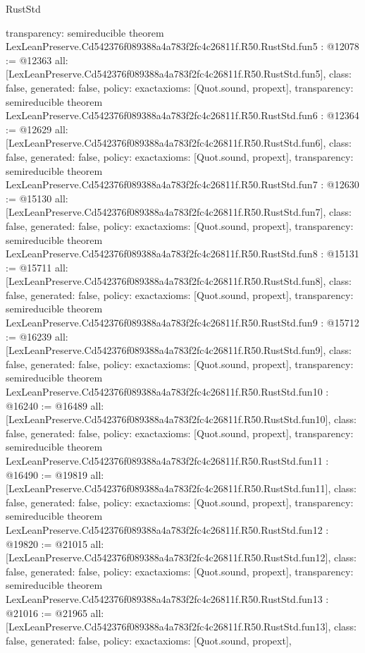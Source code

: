 \begin{lexlean}{RustStd}
\begin{coremodule}
{  transparency: semireducible
}
theorem LexLeanPreserve.Cd542376f089388a4a783f2fc4c26811f.R50.RustStd.fun5 : @12078 := @12363 {
  all: [LexLeanPreserve.Cd542376f089388a4a783f2fc4c26811f.R50.RustStd.fun5],
  class: false,
  generated: false,
  policy: exact{axioms: [Quot.sound, propext]},
  transparency: semireducible
}
theorem LexLeanPreserve.Cd542376f089388a4a783f2fc4c26811f.R50.RustStd.fun6 : @12364 := @12629 {
  all: [LexLeanPreserve.Cd542376f089388a4a783f2fc4c26811f.R50.RustStd.fun6],
  class: false,
  generated: false,
  policy: exact{axioms: [Quot.sound, propext]},
  transparency: semireducible
}
theorem LexLeanPreserve.Cd542376f089388a4a783f2fc4c26811f.R50.RustStd.fun7 : @12630 := @15130 {
  all: [LexLeanPreserve.Cd542376f089388a4a783f2fc4c26811f.R50.RustStd.fun7],
  class: false,
  generated: false,
  policy: exact{axioms: [Quot.sound, propext]},
  transparency: semireducible
}
theorem LexLeanPreserve.Cd542376f089388a4a783f2fc4c26811f.R50.RustStd.fun8 : @15131 := @15711 {
  all: [LexLeanPreserve.Cd542376f089388a4a783f2fc4c26811f.R50.RustStd.fun8],
  class: false,
  generated: false,
  policy: exact{axioms: [Quot.sound, propext]},
  transparency: semireducible
}
theorem LexLeanPreserve.Cd542376f089388a4a783f2fc4c26811f.R50.RustStd.fun9 : @15712 := @16239 {
  all: [LexLeanPreserve.Cd542376f089388a4a783f2fc4c26811f.R50.RustStd.fun9],
  class: false,
  generated: false,
  policy: exact{axioms: [Quot.sound, propext]},
  transparency: semireducible
}
theorem LexLeanPreserve.Cd542376f089388a4a783f2fc4c26811f.R50.RustStd.fun10 : @16240 := @16489 {
  all: [LexLeanPreserve.Cd542376f089388a4a783f2fc4c26811f.R50.RustStd.fun10],
  class: false,
  generated: false,
  policy: exact{axioms: [Quot.sound, propext]},
  transparency: semireducible
}
theorem LexLeanPreserve.Cd542376f089388a4a783f2fc4c26811f.R50.RustStd.fun11 : @16490 := @19819 {
  all: [LexLeanPreserve.Cd542376f089388a4a783f2fc4c26811f.R50.RustStd.fun11],
  class: false,
  generated: false,
  policy: exact{axioms: [Quot.sound, propext]},
  transparency: semireducible
}
theorem LexLeanPreserve.Cd542376f089388a4a783f2fc4c26811f.R50.RustStd.fun12 : @19820 := @21015 {
  all: [LexLeanPreserve.Cd542376f089388a4a783f2fc4c26811f.R50.RustStd.fun12],
  class: false,
  generated: false,
  policy: exact{axioms: [Quot.sound, propext]},
  transparency: semireducible
}
theorem LexLeanPreserve.Cd542376f089388a4a783f2fc4c26811f.R50.RustStd.fun13 : @21016 := @21965 {
  all: [LexLeanPreserve.Cd542376f089388a4a783f2fc4c26811f.R50.RustStd.fun13],
  class: false,
  generated: false,
  policy: exact{axioms: [Quot.sound, propext]},
}
\end{coremodule}
\end{lexlean}
